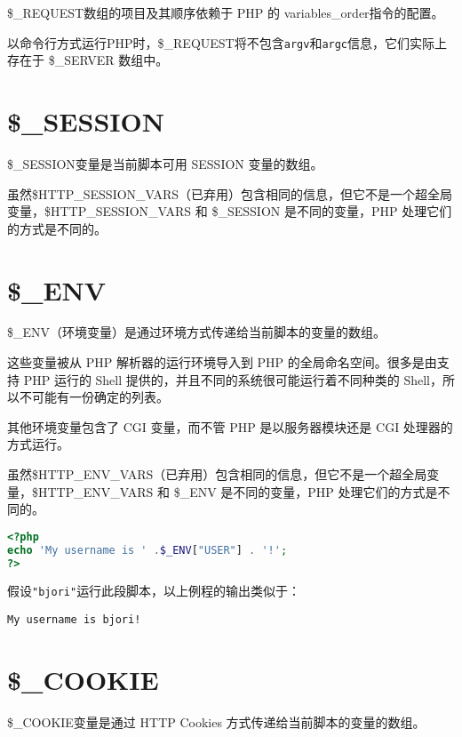 \$\_REQUEST数组的项目及其顺序依赖于 PHP 的 variables\_order指令的配置。

以命令行方式运行PHP时，\$\_REQUEST将不包含\texttt{argv}和\texttt{argc}信息，它们实际上存在于 \$\_SERVER 数组中。




\section{\$\_SESSION}


\$\_SESSION变量是当前脚本可用 SESSION 变量的数组。

虽然\$HTTP\_SESSION\_VARS（已弃用）包含相同的信息，但它不是一个超全局变量，\$HTTP\_SESSION\_VARS 和 \$\_SESSION 是不同的变量，PHP 处理它们的方式是不同的。


\section{\$\_ENV}


\$\_ENV（环境变量）是通过环境方式传递给当前脚本的变量的数组。

这些变量被从 PHP 解析器的运行环境导入到 PHP 的全局命名空间。很多是由支持 PHP 运行的 Shell 提供的，并且不同的系统很可能运行着不同种类的 Shell，所以不可能有一份确定的列表。

其他环境变量包含了 CGI 变量，而不管 PHP 是以服务器模块还是 CGI 处理器的方式运行。

虽然\$HTTP\_ENV\_VARS（已弃用）包含相同的信息，但它不是一个超全局变量，\$HTTP\_ENV\_VARS 和 \$\_ENV 是不同的变量，PHP 处理它们的方式是不同的。






\begin{lstlisting}[language=PHP]
<?php
echo 'My username is ' .$_ENV["USER"] . '!';
?>
\end{lstlisting}


假设\texttt{"bjori"}运行此段脚本，以上例程的输出类似于：

\begin{verbatim}
My username is bjori!
\end{verbatim}




\section{\$\_COOKIE}

\$\_COOKIE变量是通过 HTTP Cookies 方式传递给当前脚本的变量的数组。


